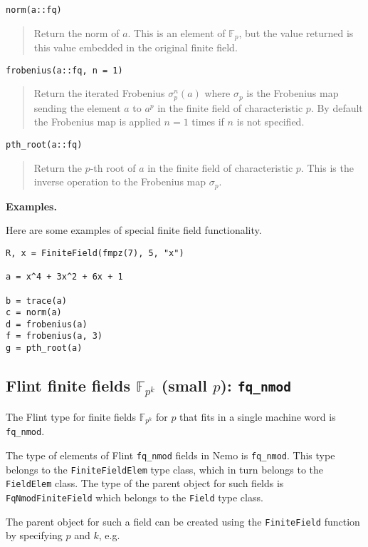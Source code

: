 \documentclass[a4paper,10pt]{article}
\newcommand{\F}{\mathbb{F}}
\newcommand{\code}{\lstinline}
\newcommand{\desc}[1]{\vspace{-3mm}\begin{quote}#1\end{quote}}
\begin{document}
{{\begin{lstlisting}
norm(a::fq)
\end{lstlisting}

\desc{Return the norm of $a$. This is an element of $\F_p$, but the value
returned is this value embedded in the original finite field.}

\begin{lstlisting}
frobenius(a::fq, n = 1)
\end{lstlisting}

\desc{Return the iterated Frobenius $\sigma_p^n(a)$ where $\sigma_p$ is the 
Frobenius map sending the element $a$ to $a^p$ in the finite field of 
characteristic $p$. By default the Frobenius map is applied $n = 1$ times if
$n$ is not specified.}

\begin{lstlisting}
pth_root(a::fq)
\end{lstlisting}

\desc{Return the $p$-th root of $a$ in the finite field of characteristic
$p$. This is the inverse operation to the Frobenius map $\sigma_p$.}

\textbf{Examples.}

Here are some examples of special finite field functionality.

\begin{lstlisting}
R, x = FiniteField(fmpz(7), 5, "x")

a = x^4 + 3x^2 + 6x + 1

b = trace(a)
c = norm(a)
d = frobenius(a)
f = frobenius(a, 3)
g = pth_root(a)
\end{lstlisting}

\subsection{Flint finite fields $\F_{p^k}$ (small $p$): \code|fq_nmod|}

The Flint type for finite fields $\F_{p^k}$ for $p$ that fits in a single machine
word is \code{fq_nmod}.

The type of elements of Flint \code{fq_nmod} fields in Nemo is \code{fq_nmod}.
This type belongs to the \code{FiniteFieldElem} type class, which in turn belongs
to the \code{FieldElem} class. The type of the parent object for such fields is
\code{FqNmodFiniteField} which belongs to the \code{Field} type class.

The parent object for such a field can be created using the \code{FiniteField}
function by specifying $p$ and $k$, e.g.

}}
\end{document}
